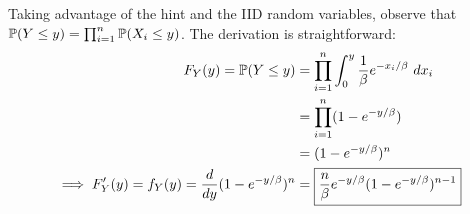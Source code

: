 \documentclass[a4paper]{article}
\begin{document}

Taking advantage of the hint and the \textsf{IID} random variables, observe that \(\mathbb{P}(Y \le y) = \prod_{i=1}^{n} \mathbb{P}(X_{i} \le y) \). The derivation is straightforward:
\begin{align*}
	F_{Y}(y) = \mathbb{P}(Y \le y) & = \prod_{i=1}^{n} \int^{y}_{0} \frac{1}{\beta }e^{-x_{i}/\beta } \ dx_{i}   \\
	 & = \prod_{i=1}^{n} (1 - e^{-y/\beta })  \\
	 & = (1 - e^{-y/\beta })^{n} \\
	\implies F'_{Y}(y) = f_{Y}(y) = \frac{d }{d y} (1 - e^{-y/\beta })^{n} & = \boxed{\frac{n}{\beta } e^{-y/\beta }(1 - e^{-y/\beta })^{n-1}}
\end{align*}
\end{document}
